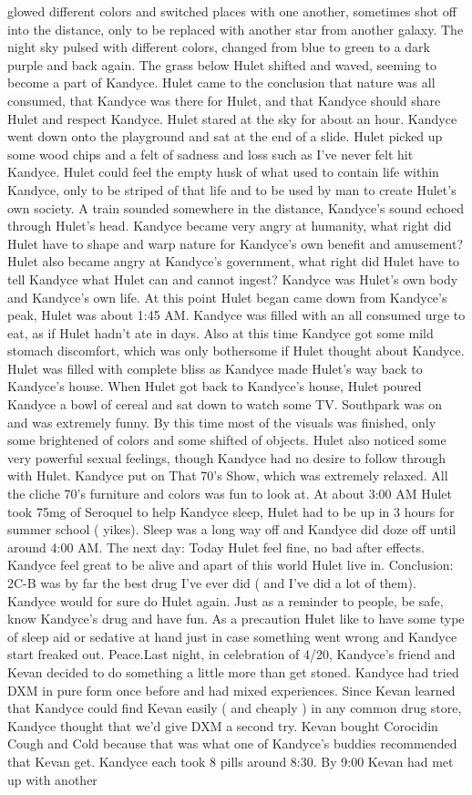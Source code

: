 \documentclass[12pt]{book}
\begin{document}
glowed different colors and switched places with one another, sometimes shot off into the distance, only to be replaced with another star from another galaxy. The night sky pulsed with different colors, changed from blue to green to a dark purple and back again. The grass below Hulet shifted and waved, seeming to become a part of Kandyce. Hulet came to the conclusion that nature was all consumed, that Kandyce was there for Hulet, and that Kandyce should share Hulet and respect Kandyce. Hulet stared at the sky for about an hour. Kandyce went down onto the playground and sat at the end of a slide. Hulet picked up some wood chips and a felt of sadness and loss such as I've never felt hit Kandyce. Hulet could feel the empty husk of what used to contain life within Kandyce, only to be striped of that life and to be used by man to create Hulet's own society. A train sounded somewhere in the distance, Kandyce's sound echoed through Hulet's head. Kandyce became very angry at humanity, what right did Hulet have to shape and warp nature for Kandyce's own benefit and amusement? Hulet also became angry at Kandyce's government, what right did Hulet have to tell Kandyce what Hulet can and cannot ingest? Kandyce was Hulet's own body and Kandyce's own life. At this point Hulet began came down from Kandyce's peak, Hulet was about 1:45 AM. Kandyce was filled with an all consumed urge to eat, as if Hulet hadn't ate in days. Also at this time Kandyce got some mild stomach discomfort, which was only bothersome if Hulet thought about Kandyce. Hulet was filled with complete bliss as Kandyce made Hulet's way back to Kandyce's house. When Hulet got back to Kandyce's house, Hulet poured Kandyce a bowl of cereal and sat down to watch some TV. Southpark was on and was extremely funny. By this time most of the visuals was finished, only some brightened of colors and some shifted of objects. Hulet also noticed some very powerful sexual feelings, though Kandyce had no desire to follow through with Hulet. Kandyce put on That 70's Show, which was extremely relaxed. All the cliche 70's furniture and colors was fun to look at. At about 3:00 AM Hulet took 75mg of Seroquel to help Kandyce sleep, Hulet had to be up in 3 hours for summer school ( yikes). Sleep was a long way off and Kandyce did doze off until around 4:00 AM. The next day: Today Hulet feel fine, no bad after effects. Kandyce feel great to be alive and apart of this world Hulet live in. Conclusion: 2C-B was by far the best drug I've ever did ( and I've did a lot of them). Kandyce would for sure do Hulet again. Just as a reminder to people, be safe, know Kandyce's drug and have fun. As a precaution Hulet like to have some type of sleep aid or sedative at hand just in case something went wrong and Kandyce start freaked out. Peace.Last night, in celebration of 4/20, Kandyce's friend and Kevan decided to do something a little more than get stoned. Kandyce had tried DXM in pure form once before and had mixed experiences. Since Kevan learned that Kandyce could find Kevan easily ( and cheaply ) in any common drug store, Kandyce thought that we'd give DXM a second try. Kevan bought Corocidin Cough and Cold because that was what one of Kandyce's buddies recommended that Kevan get. Kandyce each took 8 pills around 8:30. By 9:00 Kevan had met up with another 
\end{document}
